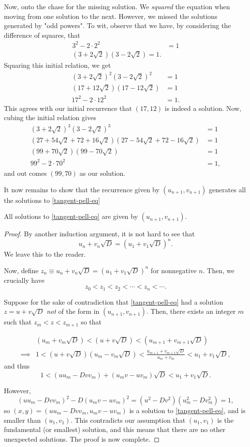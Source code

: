 \documentclass[../jarvis.tex]{subfiles}
\begin{document}
Now, onto the chase for the missing solution. We \textit{squared} the equation when moving from one solution to the next. However, we missed the solutions generated by "odd powers". To wit, observe that we have, by considering the difference of squares, that
\begin{align*}
    3^2-2\cdot2^2&=1 \\
    (3+2\sqrt{2})(3-2\sqrt{2})=1. 
\end{align*}
Squaring this initial relation, we get
\begin{align*}
    (3+2\sqrt{2})^2(3-2\sqrt{2})^2&=1 \\
    (17+12\sqrt{2})(17-12\sqrt{2})&=1 \\
    17^2-2\cdot12^2&=1.
\end{align*}
This agrees with our initial recurrence that $(17,12)$ is indeed a solution. Now, cubing the initial relation gives
\begin{align*}
    (3+2\sqrt{2})^3(3-2\sqrt{2})^3&=1 \\
    (27+54\sqrt{2}+72+16\sqrt{2})(27-54\sqrt{2}+72-16\sqrt{2})&=1 \\
    (99+70\sqrt{2})(99-70\sqrt{2})&=1\\
    99^2-2\cdot70^2&=1,
\end{align*}
and out comes $(99,70)$ as our solution.

It now remains to show that the recurrence given by $(u_{n+1},v_{n+1})$ generates all the solutions to \eqref{tangent-pell-eq}
\begin{lemma}
    All solutions to \eqref{tangent-pell-eq} are given by $(u_{n+1},v_{n+1})$.
\end{lemma}
\begin{proof}
    By another induction argument, it is not hard to see that 
    $$u_n+v_n\sqrt{D}=(u_1+v_1\sqrt{D})^n.$$
    We leave this to the reader.
    
    Now, define $z_n\equiv u_n+v_n\sqrt{D}=(u_1+v_1\sqrt{D})^n$ for nonnegative $n$. Then, we crucially have
    $$z_0<z_1<z_2<\cdots<z_n<\cdots.$$
    
    Suppose for the sake of contradiction that \eqref{tangent-pell-eq} had a solution $z=u+v\sqrt{D}$ \textit{not} of the form in $(u_{n+1},v_{n+1})$. Then, there exists an integer $m$ such that $z_m<z<z_{m+1}$ so that
    
    \begin{align*}
        &(u_m+v_m\sqrt{D})<(u+v\sqrt{D})<(u_{m+1}+v_{m+1}\sqrt{D}) \\
        \implies& 1<(u+v\sqrt{D})(u_m-v_m\sqrt{D})<\frac{u_{m+1}+v_{m+1}\sqrt{D}}{u_m+v_m}<u_1+v_1\sqrt{D},
    \end{align*}
    and thus
    $$1<(uu_m-Dvv_m)+(u_mv-uv_m)\sqrt{D}<u_1+v_1\sqrt{D}.$$
    
    However,
    $$(uu_m-Dvv_m)^2-D(u_mv-uv_m)^2=(u^2-Dv^2)(u_m^2-Dv_m^2)=1,$$
    so $(x,y)=(uu_m-Dvv_m,u_mv-uv_m)$ is a solution to \eqref{tangent-pell-eq}, and is smaller than $(u_1,v_1)$. This contradicts our assumption that $(u_1,v_1)$ is the fundamental (or smallest) solution, and this means that there are no other unexpected solutions. The proof is now complete.
\end{proof}
\end{document}
